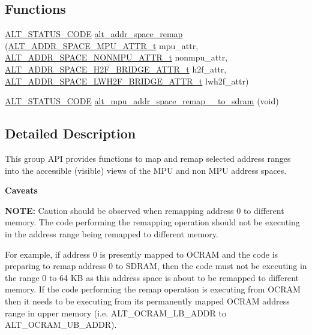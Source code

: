 \subsection*{Functions}
\begin{DoxyCompactItemize}
\item 
\mbox{\hyperlink{hwlib_8h_abdb0d369f069723ca55d6c94bcaaaa12}{A\+L\+T\+\_\+\+S\+T\+A\+T\+U\+S\+\_\+\+C\+O\+DE}} \mbox{\hyperlink{group__ADDR__SPACE__MGR__REMAP_ga846f60380f43b3b7f3f020332602367f}{alt\+\_\+addr\+\_\+space\+\_\+remap}} (\mbox{\hyperlink{group__ADDR__SPACE__MGR__REMAP_ga7b565bdc174300bbaf78d71ec496ac05}{A\+L\+T\+\_\+\+A\+D\+D\+R\+\_\+\+S\+P\+A\+C\+E\+\_\+\+M\+P\+U\+\_\+\+A\+T\+T\+R\+\_\+t}} mpu\+\_\+attr, \mbox{\hyperlink{group__ADDR__SPACE__MGR__REMAP_ga380facdcf5796d231a7bfaed1f444178}{A\+L\+T\+\_\+\+A\+D\+D\+R\+\_\+\+S\+P\+A\+C\+E\+\_\+\+N\+O\+N\+M\+P\+U\+\_\+\+A\+T\+T\+R\+\_\+t}} nonmpu\+\_\+attr, \mbox{\hyperlink{group__ADDR__SPACE__MGR__REMAP_gae53e07cd2bd2dec130fa387c5242b8bd}{A\+L\+T\+\_\+\+A\+D\+D\+R\+\_\+\+S\+P\+A\+C\+E\+\_\+\+H2\+F\+\_\+\+B\+R\+I\+D\+G\+E\+\_\+\+A\+T\+T\+R\+\_\+t}} h2f\+\_\+attr, \mbox{\hyperlink{group__ADDR__SPACE__MGR__REMAP_gac800113e41ec261e9babdebcd057d754}{A\+L\+T\+\_\+\+A\+D\+D\+R\+\_\+\+S\+P\+A\+C\+E\+\_\+\+L\+W\+H2\+F\+\_\+\+B\+R\+I\+D\+G\+E\+\_\+\+A\+T\+T\+R\+\_\+t}} lwh2f\+\_\+attr)
\item 
\mbox{\hyperlink{hwlib_8h_abdb0d369f069723ca55d6c94bcaaaa12}{A\+L\+T\+\_\+\+S\+T\+A\+T\+U\+S\+\_\+\+C\+O\+DE}} \mbox{\hyperlink{group__ADDR__SPACE__MGR__REMAP_gade38251cec2dd0904eb1f9f1dfa34d9f}{alt\+\_\+mpu\+\_\+addr\+\_\+space\+\_\+remap\+\_\+\_\+to\+\_\+sdram}} (void)
\end{DoxyCompactItemize}


\subsection{Detailed Description}
This group A\+PI provides functions to map and remap selected address ranges into the accessible (visible) views of the M\+PU and non M\+PU address spaces.

{\bfseries{Caveats}} 

{\bfseries{N\+O\+TE\+:}} Caution should be observed when remapping address 0 to different memory. The code performing the remapping operation should not be executing in the address range being remapped to different memory.

For example, if address 0 is presently mapped to O\+C\+R\+AM and the code is preparing to remap address 0 to S\+D\+R\+AM, then the code must not be executing in the range 0 to 64 KB as this address space is about to be remapped to different memory. If the code performing the remap operation is executing from O\+C\+R\+AM then it needs to be executing from its permanently mapped O\+C\+R\+AM address range in upper memory (i.\+e. A\+L\+T\+\_\+\+O\+C\+R\+A\+M\+\_\+\+L\+B\+\_\+\+A\+D\+DR to A\+L\+T\+\_\+\+O\+C\+R\+A\+M\+\_\+\+U\+B\+\_\+\+A\+D\+DR).

